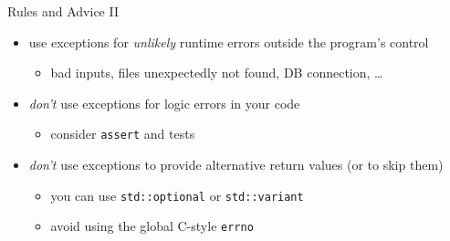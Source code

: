 \begin{frame}[fragile]
  \begin{block}{Rules and Advice II}
    \begin{itemize}
      \item use exceptions for \textit{unlikely} runtime errors outside the program's control
      \begin{itemize}
        \item  bad inputs, files unexpectedly not found, DB connection, \ldots
      \end{itemize}
      \item \textit{don't} use exceptions for logic errors in your code
      \begin{itemize}
        \item consider \texttt{assert} and tests
      \end{itemize}
      \item \textit{don't} use exceptions to provide alternative return values (or to skip them)
      \begin{itemize}
        \item you can use \texttt{std::optional} or \texttt{std::variant}
        \item avoid using the global C-style \texttt{errno}
      \end{itemize}
    \end{itemize}
  \end{block}
\end{frame}

